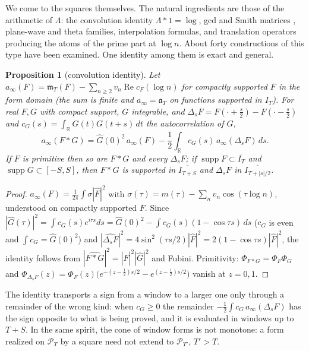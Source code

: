 \documentclass[11pt]{amsart}
\newtheorem{proposition}[theorem]{Proposition}
\theoremstyle{definition}
\theoremstyle{remark}
\numberwithin{equation}{section}
\newcommand{\R}{\mathbb{R}}
\DeclareMathOperator{\Rel}{Re}
\DeclareMathOperator{\supp}{supp}
\newcommand{\IT}{I_T}                                  %
\newcommand{\Fh}{\widehat F}                           %
\newcommand{\cF}{c_F}                                  %
\newcommand{\PhiF}{\Phi_F}                             %
\newcommand{\PT}{\mathcal{P}_T}                        %
\newcommand{\mT}{\mathfrak{m}_T}                       %
\newcommand{\aT}{\mathfrak{a}_T}                       %
\begin{document}
\label{w4:tab:sos}%
We come to the squares themselves. The natural ingredients are those of the arithmetic of $\Lambda$: the convolution
identity $\Lambda*1=\log$, gcd and Smith matrices \cite{Smith1876}, plane-wave and theta families, interpolation
formulas, and translation operators producing the atoms of the prime part at $\log n$. About forty constructions of
this type have been examined. One identity among them is exact and general.

\begin{proposition}[convolution identity]\label{w4:prop:conv}
Let $a_\infty(F)=\mT(F)-\sum_{n\ge2}v_n\Rel\cF(\log n)$ for compactly supported $F$ in the form domain (the sum is finite and
$a_\infty=\aT$ on functions supported in $\IT$). For real $F,G$ with compact support, $G$ integrable, and $\Delta_sF=F(\cdot+\frac s2)-F(\cdot-\frac s2)$ and $c_G(s)=\int_\R G(t)G(t+s)\,dt$ the autocorrelation of $G$,
\[
a_\infty(F*G)=\widehat G(0)^2\,a_\infty(F)-\frac12\int_{\R}c_G(s)\,a_\infty(\Delta_sF)\,ds .
\]
If $F$ is primitive then so are $F*G$ and every $\Delta_sF$; if $\supp F\subset\overline{I_T}$ and $\supp G\subset[-S,S]$, then $F*G$ is
supported in $\overline{I_{T+S}}$ and $\Delta_sF$ in $\overline{I_{T+|s|/2}}$.
\end{proposition}

\begin{proof}
$a_\infty(F)=\frac1{2\pi}\int\sigma|\Fh|^2$ with $\sigma(\tau)=m(\tau)-\sum_nv_n\cos(\tau\log n)$, understood on compactly supported $F$.
Since $|\widehat G(\tau)|^2=\int c_G(s)e^{i\tau s}ds=\widehat G(0)^2-\int c_G(s)(1-\cos\tau s)\,ds$ ($c_G$ is even and $\int c_G=\widehat G(0)^2$)
and $|\widehat{\Delta_sF}|^2=4\sin^2(\tau s/2)|\Fh|^2=2(1-\cos\tau s)|\Fh|^2$, the identity follows from $|\widehat{F*G}|^2=|\Fh|^2|\widehat G|^2$
and Fubini. Primitivity: $\Phi_{F*G}=\PhiF\Phi_G$ and $\Phi_{\Delta_sF}(z)=\PhiF(z)\big(e^{-(z-\frac12)s/2}-e^{(z-\frac12)s/2}\big)$ vanish at $z=0,1$.
\end{proof}

The identity transports a sign from a window to a larger one only through a remainder of the wrong kind: when $c_G\ge0$
the remainder $-\frac12\int c_G\,a_\infty(\Delta_sF)$ has the sign opposite to what is being proved, and it is evaluated
in windows up to $T+S$. In the same spirit, the cone of window forms is not monotone: a form realized on $\PT$ by a
square need not extend to $\mathcal P_{T'}$, $T'>T$.
\end{document}
